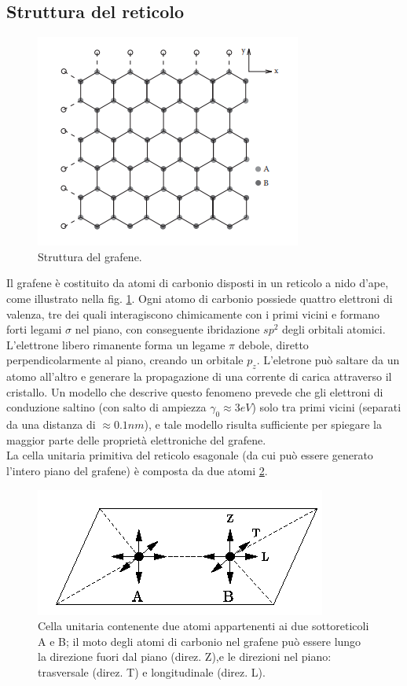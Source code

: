\documentclass[a4paper,titlepage]{book}
\begin{document}
\subsection{Struttura del reticolo}
\begin{figure}[h!] 
	\centering
	\includegraphics[width=0.6\columnwidth]{praghene.png}
	\caption{ 	\label{pra}
		Struttura del grafene.
	}
\end{figure}
Il grafene è costituito da atomi di carbonio disposti in un reticolo a nido d'ape, come illustrato nella fig. \ref{pra}. Ogni atomo di carbonio possiede quattro elettroni di valenza, tre dei quali interagiscono chimicamente con i primi vicini e formano forti legami $\sigma$ nel piano, con conseguente ibridazione $sp^2$ degli orbitali atomici. L'elettrone libero rimanente forma un legame $\pi$ debole, diretto perpendicolarmente al piano, creando un orbitale $p_z$. L'eletrone può saltare da un atomo all'altro e generare la propagazione di una corrente di carica attraverso il cristallo. Un modello che descrive questo fenomeno prevede che gli elettroni di conduzione saltino (con salto di ampiezza  $\gamma_0 \approx 3 eV$)  solo tra primi vicini (separati da una distanza di $\approx 0.1 nm$), e tale modello risulta sufficiente per spiegare la maggior parte delle proprietà elettroniche del grafene.\\
La cella unitaria primitiva del reticolo esagonale (da cui può essere generato l'intero piano del grafene) è composta da due atomi \ref{label}.
\begin{figure}[h!] 
	\centering
	\includegraphics[width=0.6\columnwidth]{cellunit.png}
	\caption{ 	\label{label}
		Cella unitaria contenente due atomi appartenenti ai due sottoreticoli A e B; il moto degli atomi di carbonio nel grafene può essere lungo la direzione fuori dal piano (direz. Z),e le direzioni nel piano: trasversale (direz. T) e longitudinale (direz. L). 
	}
\end{figure}
\end{document}
